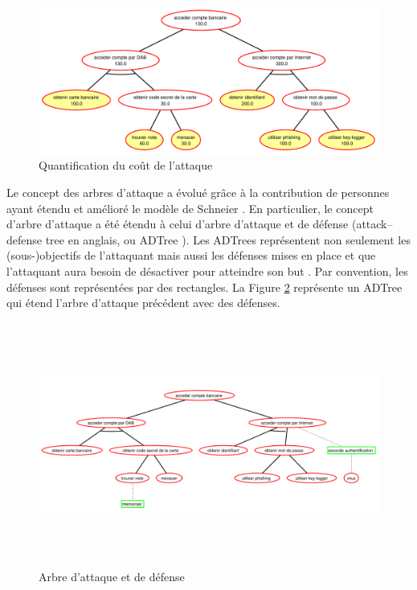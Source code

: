         \begin{figure}[h]
	        \centering
	        \includegraphics[width=1\textwidth]{figure/quantification.pdf}
	        \caption{Quantification du coût de l'attaque}
	        \label{fig:arbre_exemple_2}
        \end{figure}

		Le concept des arbres d'attaque a évolué grâce à la contribution de personnes ayant étendu et amélioré le modèle de Schneier \cite{ADTreeKordy}. En particulier, le concept d'arbre d'attaque a été étendu à celui d’arbre d’attaque et de défense (\og attack–defense tree \fg{} en anglais, ou \og ADTree \fg{}). Les ADTrees représentent non seulement les (sous-)objectifs de l'attaquant mais aussi les défenses mises en place et que l'attaquant aura besoin de désactiver pour atteindre son but \cite{ADTreeOxford}. Par convention, les défenses sont représentées par des rectangles. La Figure \ref{fig:arbre_exemple_3} représente un ADTree qui étend l'arbre d'attaque précédent avec des défenses.

        \begin{figure}[h]
	\hspace{-3cm}
	        \includegraphics[height=8cm]{figure/exemple2_rapport.pdf}
	        \caption{Arbre d'attaque et de défense}
	        \label{fig:arbre_exemple_3}
        \end{figure}

